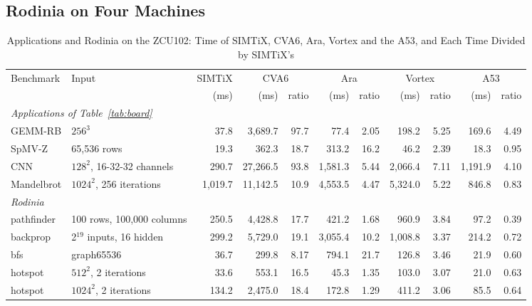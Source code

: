 \documentclass[journal]{IEEEtran}
\begin{document}
\subsection{Rodinia on Four Machines}\label{sec:rodinia}
\begin{table}[t]
\caption{Applications and Rodinia on the ZCU102: Time of SIMTiX, CVA6, Ara, Vortex and
the A53, and Each Time Divided by SIMTiX's}
\label{tab:rodinia}
\centering\footnotesize
\setlength{\tabcolsep}{3.2pt}
\begin{tabular}{llrrrrrrrrr}
\toprule
Benchmark & Input & SIMTiX & \multicolumn{2}{c}{CVA6} & \multicolumn{2}{c}{Ara}
 & \multicolumn{2}{c}{Vortex} & \multicolumn{2}{c}{A53}\\
\cmidrule(lr){4-5}\cmidrule(lr){6-7}\cmidrule(lr){8-9}\cmidrule(lr){10-11}
 & & (ms) & (ms) & ratio & (ms) & ratio & (ms) & ratio & (ms) & ratio\\
\midrule
\multicolumn{11}{l}{\emph{Applications of Table~\ref{tab:board}}}\\
GEMM-RB    & $256^3$                       & 37.8    & 3,689.7   & 97.7 & 77.4     & 2.05 & 198.2    & 5.25 & 169.6    & 4.49\\
SpMV-Z     & 65,536 rows                   & 19.3    & 362.3     & 18.7 & 313.2    & 16.2 & 46.2     & 2.39 & 18.3     & 0.95\\
CNN        & $128^2$, 16-32-32 channels    & 290.7   & 27,266.5  & 93.8 & 1,581.3  & 5.44 & 2,066.4  & 7.11 & 1,191.9  & 4.10\\
Mandelbrot & $1024^2$, 256 iterations      & 1,019.7 & 11,142.5  & 10.9 & 4,553.5  & 4.47 & 5,324.0  & 5.22 & 846.8    & 0.83\\
\midrule
\multicolumn{11}{l}{\emph{Rodinia}}\\
pathfinder & 100 rows, 100,000 columns   & 250.5   & 4,428.8   & 17.7 & 421.2    & 1.68 & 960.9    & 3.84 & 97.2     & 0.39\\
backprop   & 2$^{19}$ inputs, 16 hidden    & 299.2   & 5,729.0   & 19.1 & 3,055.4  & 10.2 & 1,008.8  & 3.37 & 214.2    & 0.72\\
bfs        & graph65536                    & 36.7    & 299.8     & 8.17 & 794.1    & 21.7 & 126.8    & 3.46 & 21.9     & 0.60\\
hotspot    & $512^2$, 2 iterations         & 33.6    & 553.1     & 16.5 & 45.3     & 1.35 & 103.0    & 3.07 & 21.0     & 0.63\\
hotspot    & $1024^2$, 2 iterations        & 134.2   & 2,475.0   & 18.4 & 172.8    & 1.29 & 411.2    & 3.06 & 85.5     & 0.64\\

\end{tabular}
\end{table}
\end{document}
